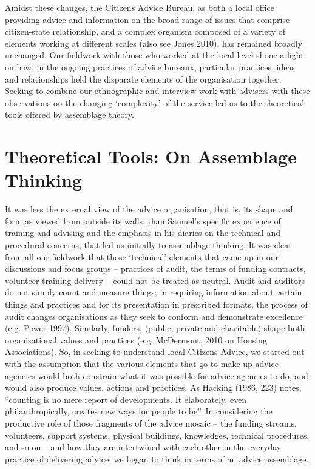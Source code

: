 Amidst these changes, the Citizens Advice Bureau, as both a local office providing advice and information on the broad range of issues that comprise citizen-state relationship, and a complex organism composed of a variety of elements working at different scales (also see Jones 2010), has remained broadly unchanged. Our fieldwork with those who worked at the local level shone a light on how, in the ongoing practices of advice bureaux, particular practices, ideas and relationships held the disparate elements of the organisation together. Seeking to combine our ethnographic and interview work with advisers with these observations on the changing ‘complexity’ of the service led us to the theoretical tools offered by assemblage theory.

\chapter{Theoretical Tools: On Assemblage Thinking}
It was less the external view of the advice organisation, that is, its shape and form as viewed from outside its walls, than Samuel’s specific experience of training and advising and the emphasis in his diaries on the technical and procedural concerns, that led us initially to assemblage thinking.  It was clear from all our fieldwork that those ‘technical’ elements that came up in our discussions and focus groups – practices of audit, the terms of funding contracts, volunteer training delivery – could not be treated as neutral. Audit and auditors do not simply count and measure things; in requiring information about certain things and practices and for its presentation in prescribed formats, the process of audit changes organisations as they seek to conform and demonstrate excellence (e.g. Power 1997). Similarly, funders, (public, private and charitable) shape both organisational values and practices (e.g. McDermont, 2010 on Housing Associations). So, in seeking to understand local Citizens Advice, we started out with the assumption that the various elements that go to make up advice agencies would both constrain what it was possible for advice agencies to do, and would also produce values, actions and practices. As Hacking (1986, 223) notes, “counting is no mere report of developments. It elaborately, even philanthropically, creates new ways for people to be”. In considering the productive role of those fragments of the advice mosaic – the funding streams, volunteers, support systems, physical buildings, knowledges, technical procedures, and so on – and how they are intertwined with each other in the everyday practice of delivering advice, we began to think in terms of an advice assemblage.
